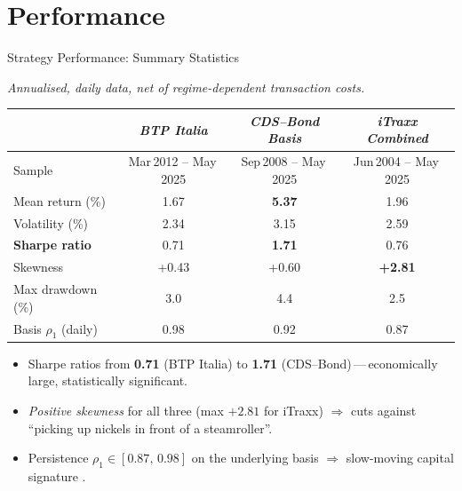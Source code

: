 \documentclass[aspectratio=169,11pt]{beamer}
\newcommand{\hlt}[1]{\textcolor{edhecred}{\textbf{#1}}}     %
\newcommand{\hltb}[1]{\textcolor{accentblue}{\textbf{#1}}}  %
\begin{document}

\section{Performance}

\begin{frame}[t]{Strategy Performance: Summary Statistics}
\centering
\small
\vspace{0.10cm}

\textit{Annualised, daily data, net of regime-dependent transaction costs.}

\vspace{0.20cm}
\renewcommand{\arraystretch}{1.20}
\setlength{\tabcolsep}{8pt}

\begin{tabular}{lccc}
\toprule
 & \textit{BTP Italia} & \textit{CDS--Bond Basis} & \textit{iTraxx Combined} \\
\midrule
Sample             & Mar\,2012 -- May\,2025 & Sep\,2008 -- May\,2025 & Jun\,2004 -- May\,2025 \\
Mean return (\%)   & 1.67  & \hlt{5.37}  & 1.96  \\
Volatility (\%)    & 2.34  & 3.15  & 2.59  \\
\hlt{Sharpe ratio} & 0.71  & \hlt{1.71}  & 0.76  \\
Skewness           & +0.43 & +0.60 & \hlt{+2.81} \\
Max drawdown (\%)  & 3.0   & 4.4   & 2.5   \\
Basis $\rho_1$ (daily) & 0.98 & 0.92 & 0.87  \\
\bottomrule
\end{tabular}

\vspace{0.30cm}

\begin{itemize}\itemsep=0.07cm\footnotesize
  \item Sharpe ratios from \hltb{0.71} (BTP Italia) to \hltb{1.71}
        (CDS--Bond)\,---\,economically large, statistically significant.
  \item \emph{Positive skewness} for all three (max $+2.81$ for iTraxx)
        $\Rightarrow$ cuts against ``picking up nickels in front of a steamroller''.
  \item Persistence $\rho_1 \in [0.87,\,0.98]$ on the underlying basis
        $\Rightarrow$ slow-moving capital signature \citep{duffie2010presidential}.
\end{itemize}

\end{frame}
\end{document}
